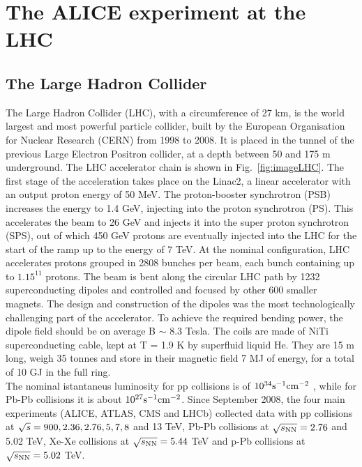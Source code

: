 \chapter{The ALICE experiment at the LHC}

\section{The Large Hadron Collider}
The Large Hadron Collider (LHC), with a circumference of 27 km, 
is the world largest and most powerful particle collider, built by the 
European Organisation for Nuclear Research (CERN) from 1998 to 2008. 
It is placed in the tunnel of the previous Large Electron Positron collider, at a depth between 50 and 175 m underground.
The LHC accelerator chain is shown in Fig.~\ref{fig:imageLHC}. The first stage 
of the acceleration takes place on the Linac2, a linear accelerator with an 
output proton energy of 50 MeV. The proton-booster synchrotron (PSB) increases 
the energy to 1.4 GeV, injecting into the proton synchrotron (PS). This accelerates the
 beam to 26 GeV and injects it into the super proton synchrotron (SPS), out of which 
 450 GeV protons are eventually injected into the LHC for the start of the ramp up to 
 the energy of 7 TeV. At the nominal configuration, LHC accelerates protons grouped in 2808 bunches per beam, each bunch 
 containing up to $1.15^{11}$ protons. The beam is bent along the circular LHC 
 path by 1232 superconducting dipoles and controlled and focused by other 
 600 smaller magnets. The design and construction of the dipoles was the most 
 technologically challenging part of the accelerator. To achieve the required bending power, 
 the dipole field should be on average B $\sim$ 8.3 Tesla. The coils are made of 
 NiTi superconducting cable, kept at T = 1.9 K by superfluid liquid He. They are 
 15 m long, weigh 35 tonnes and store in their magnetic field 7 MJ of energy, for a total of 10 GJ in the full ring.\\
The nominal istantaneus luminosity for pp collisions is of $10^{34} {\rm s}^{-1} {\rm cm}^{-2}$ , while for 
Pb-Pb collisions it is about $10^{27} {\rm s}^{-1} {\rm cm}^{-2}$. Since September 2008, 
the four main experiments (ALICE, ATLAS, CMS and LHCb) collected data with pp
 collisions at $\sqrt{s}=900, 2.36, 2.76, 5, 7, 8$ and 13 TeV, 
 Pb-Pb collisions at $\sqrt{s_{\rm NN}}=2.76$ and 5.02 TeV, Xe-Xe collisions at $\sqrt{s_{\rm NN}}=5.44$ TeV and p-Pb collisions at $\sqrt{s_{\rm NN}}=5.02$ TeV.

